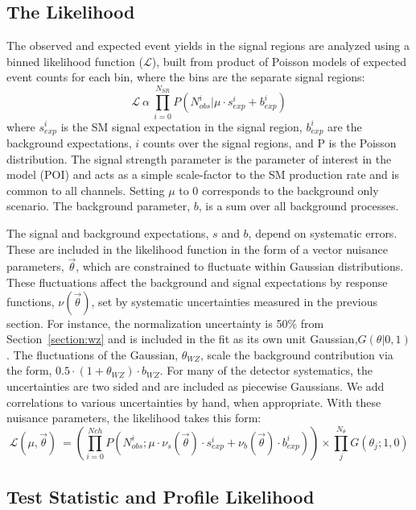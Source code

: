 \subsection{The Likelihood} 
The observed and expected event yields in the signal regions are analyzed using a binned likelihood function ($\mathcal{L}$), built from product of Poisson models of expected event counts for each bin, where the bins are the separate signal regions:
\begin{equation}
\mathcal{L}\ \alpha\  \prod_{i=0}^{N_{SR}} P(N_{obs}^{i}| \mu \cdot s_{exp}^{i} + b_{exp}^{i})
\end{equation}
where $s_{exp}^i$ is the SM signal expectation in the signal region, $b_{exp}^i$ are the background expectations, $i$ counts over the signal regions, and P is the Poisson distribution. The signal strength parameter is the parameter of interest in the model (POI) and acts as a simple scale-factor to the SM \tth production rate and is common to all channels. Setting $\mu$ to 0 corresponds to the background only scenario. The background parameter, $b$, is a sum over all background processes. 

The signal and background expectations, $s$ and $b$, depend on systematic errors. These are included in the likelihood function in the form of a vector nuisance parameters, $\vec{\theta}$, which are constrained to fluctuate within Gaussian distributions. These fluctuations affect the background and signal expectations by response functions, $\nu(\vec{\theta})$, set by systematic uncertainties measured in the previous section. For instance, the \WZ normalization uncertainty is 50\% from Section~\ref{section:wz} and is included in the fit as its own unit Gaussian,$G(\theta|0,1)$. The fluctuations of the Gaussian, $\theta_{WZ}$, scale the background contribution via the form, $0.5\cdot(1+\theta_{WZ})\cdot b_{WZ}$. For many of the detector systematics, the uncertainties are two sided and are included as piecewise Gaussians. We add correlations to various uncertainties by hand, when appropriate. With these nuisance parameters, the likelihood takes this form:
\begin{equation}
\mathcal{L}(\mu,\vec{\theta})\ =  \left( \prod_{i=0}^{N{ch}} P(N_{obs}^{i}; \mu \cdot \nu_{s}(\vec{\theta})\cdot s_{exp}^{i} + \nu_{b}(\vec{\theta})\cdot b_{exp}^{i}) \right) \times \prod_{j}^{N_{\theta}}G(\theta_j; 1,0)
\end{equation}


\subsection{Test Statistic and Profile Likelihood}

